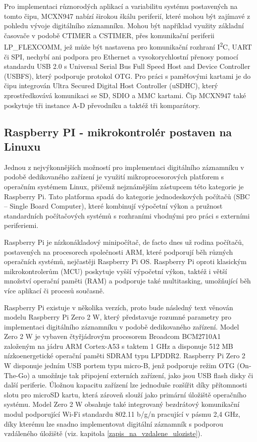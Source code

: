 Pro implementaci různorodých aplikací a variabilitu systému postavených na tomto čipu, MCXN947 nabízí širokou škálu periferií, které mohou být zajímavé z pohledu vývoje digitálního záznamníku. Mohou být například využity základní časovače v podobě CTIMER a CSTIMER, přes komunikační periferii LP\_FLEXCOMM, jež může být nastavena pro komunikační rozhraní I\textsuperscript{2}C, UART či SPI, nechybí ani podpora pro Ethernet a vysokorychlostní přenosy pomocí standardu USB 2.0 s Universal Serial Bus Full Speed Host and Device Controller (USBFS), který podporuje protokol OTG. Pro práci s paměťovými kartami je do čipu integrován Ultra Secured Digital Host Controller (uSDHC), který zprostředkovává komunikaci se SD, SDIO a MMC kartami. Čip MCXN947 také poskytuje tři instance A-D převodníku a taktéž tři komparátory. \cite{nxp_MCX_Nx4x_Reference_Manual}


\subsection{Raspberry PI - mikrokontrolér postaven na Linuxu}
Jednou z nejvýkonnějších možností pro implementaci digitálního záznamníku v podobě dedikovaného zařízení je využití mikroprocesorových platforem s operačním systémem Linux, přičemž nejznámějším zástupcem této kategorie je Raspberry Pi. Tato platforma spadá do kategorie jednodeskových počítačů (SBC – Single Board Computer), které kombinují výpočetní výkon a pružnost standardních počítačových systémů s rozhraními vhodnými pro práci s externími periferiemi.

Raspberry Pi je nízkonákladový minipočítač, de facto dnes už rodina počítačů, postavených na procesorech společnosti ARM, které podporují běh různých operačních systémů, nejčastěji Raspberry Pi OS. Raspberry Pi oproti klasickým mikrokontrolerům (MCU) poskytuje vyšší výpočetní výkon, taktéž i větší množství operační paměti (RAM) a podporuje také multitasking, umožňující běh více aplikací či procesů současně.

Raspberry Pi existuje v několika verzích, proto bude následný text věnován modelu Raspberry Pi Zero 2 W, který představuje rozumné parametry pro implementaci digitálního záznamníku v podobě dedikovaného zařízení. Model Zero 2 W je vybaven čtyřjádrovým procesorem Broadcom BCM2710A1 založeným na jádru ARM Cortex-A53 s taktem 1 GHz a disponuje 512 MB nízkoenergetické operační paměti SDRAM typu LPDDR2. Raspberry Pi Zero 2 W disponuje jedním USB portem typu micro-B, jenž podporuje režim OTG (On-The-Go) a umožňuje tak připojení externích zařízení, jako jsou USB flash disky či další periferie. Úložnou kapacitu zařízení lze jednoduše rozšířit díky přítomnosti slotu pro microSD kartu, která zároveň slouží jako primární úložiště operačního systému. Model Zero 2 W obsahuje také integrovaný bezdrátový komunikační modul podporující Wi-Fi standardu 802.11 b/g/n pracující v pásmu 2,4 GHz, díky kterému lze snadno implementovat digitální záznamník s podporou vzdáleného úložiště (viz. kapitola \ref{zapis_na_vzdalene_uloziste}).

